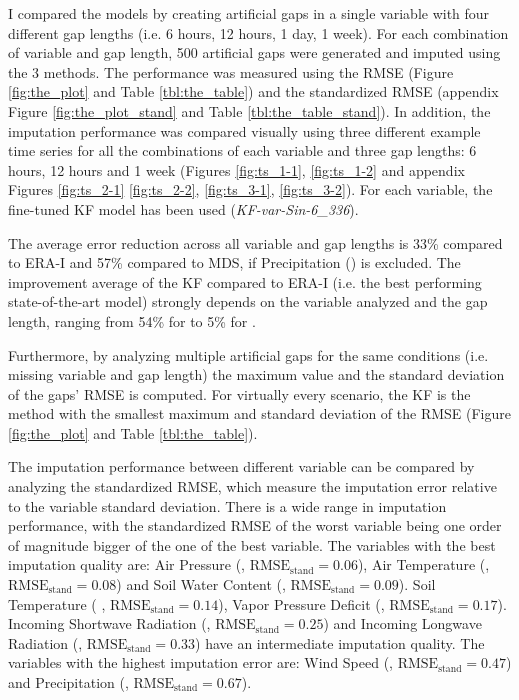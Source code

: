 \documentclass{article}
\begin{document}
I compared the models by creating artificial gaps in a single variable with four different gap lengths (i.e. 6 hours, 12 hours, 1 day, 1 week). For each combination of variable and gap length, 500 artificial gaps were generated and imputed using the 3 methods. The performance was measured using the RMSE (Figure \ref{fig:the_plot} and Table \ref{tbl:the_table}) and the standardized RMSE (appendix Figure \ref{fig:the_plot_stand} and Table \ref{tbl:the_table_stand}). In addition, the imputation performance was compared visually using three different example time series for all the combinations of each variable and three gap lengths: 6 hours, 12 hours and 1 week (Figures \ref{fig:ts_1-1}, \ref{fig:ts_1-2} and appendix Figures \ref{fig:ts_2-1} \ref{fig:ts_2-2}, \ref{fig:ts_3-1}, \ref{fig:ts_3-2}). For each variable, the fine-tuned KF model has been used (\textit{KF-\textlangle var\textrangle-Sin-6\_336}).

The average error reduction across all variable and gap lengths is 33\% compared to ERA-I and 57\% compared to MDS, if Precipitation () is excluded. The improvement average of the KF compared to ERA-I (i.e. the best performing state-of-the-art model) strongly depends on the variable analyzed and the gap length, ranging from 54\% for  to 5\% for .

Furthermore, by analyzing multiple artificial gaps for the same conditions (i.e. missing variable and gap length) the maximum value and the standard deviation of the gaps' RMSE is computed. For virtually every scenario, the KF is the method with the smallest maximum and standard deviation of the RMSE (Figure \ref{fig:the_plot} and Table \ref{tbl:the_table}). 

The imputation performance between different variable can be compared by analyzing the standardized RMSE, which measure the imputation error relative to the variable standard deviation. There is a wide range in imputation performance, with the standardized RMSE of the worst variable being one order of magnitude bigger of the one of the best variable.
The variables with the best imputation quality are:
Air Pressure (, $\text{RMSE}_{\text{stand}} = 0.06$),
Air Temperature (, $\text{RMSE}_{\text{stand}} = 0.08$)
and Soil Water Content (, $\text{RMSE}_{\text{stand}} = 0.09$).
Soil Temperature ( , $\text{RMSE}_{\text{stand}} = 0.14$),
Vapor Pressure Deficit (, $\text{RMSE}_{\text{stand}} = 0.17$).
Incoming Shortwave Radiation (, $\text{RMSE}_{\text{stand}} = 0.25$) and 
Incoming Longwave Radiation (, $\text{RMSE}_{\text{stand}} = 0.33$)
have an intermediate imputation quality.
The variables with the highest imputation error are: Wind Speed (, $\text{RMSE}_{\text{stand}} = 0.47$) and  Precipitation (, $\text{RMSE}_{\text{stand}} = 0.67$).
\end{document}
